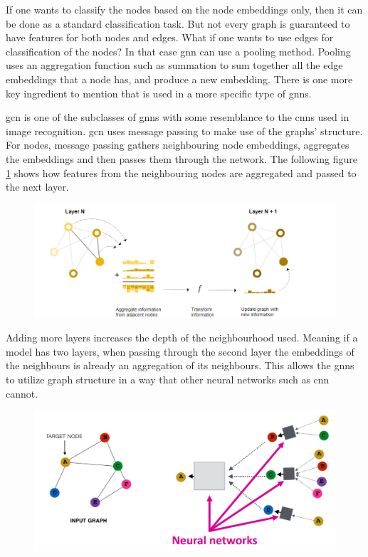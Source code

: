 If one wants to classify the nodes based on the node embeddings only, then it can be done as a standard classification task. But not every graph is guaranteed to have features for both nodes and edges. What if one wants to use edges for classification of the nodes? In that case \gls{gnn} can use a pooling method. Pooling uses an aggregation function such as summation to sum together all the edge embeddings that a node has, and produce a new embedding. There is one more key ingredient to mention that is used in a more specific type of \gls{gnn}s.

\gls{gcn} is one of the subclasses of \gls{gnn}s with some resemblance to the \gls{cnn}s used in image recognition. \gls{gcn} uses message passing to make use of the graphs' structure. For nodes, message passing gathers neighbouring node embeddings, aggregates the embeddings and then passes them through the network. The following figure \ref{Message passing example} shows how features from the neighbouring nodes are aggregated and passed to the next layer.

\begin{figure}[H]   
    \centering
    \includegraphics[scale=0.7]{figures/messagepassing}
    \label{Message passing example}
\end{figure}

Adding more layers increases the depth of the neighbourhood used. Meaning if a model has two layers, when passing through the second layer the embeddings of the neighbours is already an aggregation of its neighbours. This allows the \gls{gnn}s to utilize graph structure in a way that other neural networks such as \gls{cnn} cannot.

\begin{figure}[H]
    \centering
    \includegraphics[scale=0.4]{figures/GNNExample}
    \label{GCN example}
\end{figure}

